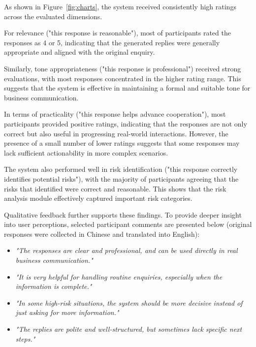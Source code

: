 \documentclass[12pt,a4paper]{report}
\begin{document}
As shown in Figure~\ref{fig:charts}, the system received consistently high ratings across the evaluated dimensions.

For relevance ("this response is reasonable"), most of participants rated the responses as 4 or 5, indicating that the generated replies were generally appropriate and aligned with the original enquiry.

Similarly, tone appropriateness ("this response is professional") received strong evaluations, with most responses concentrated in the higher rating range. This suggests that the system is effective in maintaining a formal and suitable tone for business communication.

In terms of practicality ("this response helps advance cooperation"), most participants provided positive ratings, indicating that the responses are not only correct but also useful in progressing real-world interactions. However, the presence of a small number of lower ratings suggests that some responses may lack sufficient actionability in more complex scenarios.

The system also performed well in risk identification ("this response correctly identifies potential risks"), with the majority of participants agreeing that the risks that identified were correct and reasonable. This shows that the risk analysis module effectively captured important risk categories.

Qualitative feedback further supports these findings. To provide deeper insight into user perceptions, selected participant comments are presented below (original responses were collected in Chinese and translated into English):

\begin{itemize}
    \item \textit{"The responses are clear and professional, and can be used directly in real business communication."}
    
    \item \textit{"It is very helpful for handling routine enquiries, especially when the information is complete."}
    
    \item \textit{"In some high-risk situations, the system should be more decisive instead of just asking for more information."}
    
    \item \textit{"The replies are polite and well-structured, but sometimes lack specific next steps."}
\end{itemize}
\end{document}
